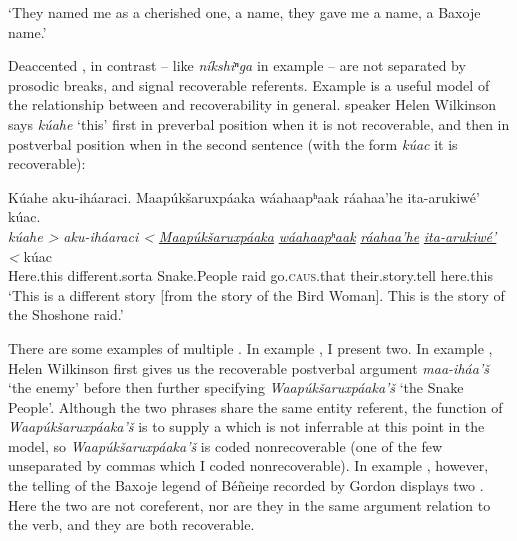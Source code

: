 \documentclass[output=paper]{LSP/langsci}
\begin{document}
\glt	`They named me as a cherished one, a name, they gave me a name, a Baxoje name.'
\z

Deaccented , in contrast -- like \emph{níkshiⁿga} in example  -- are not separated by prosodic breaks, and signal recoverable referents. Example  is a useful model of the relationship between  and recoverability in general.  speaker Helen Wilkinson says \emph{kúahe} `this' first in preverbal position when it is not recoverable, and then in postverbal position when in the second sentence (with the form \emph{kúac} it is recoverable):

\ea\label{wilkinsonpostverbal}
Kúahe aku-iháaraci. Maapúkšaruxpáaka wáahaapʰaak ráahaa’he ita-arukiwé’ kúac.\footnotemark\\
\gll	\emph{kúahe >}	\emph{aku-iháaraci <}	\emph{\underline{Maapúkšaruxpáaka}} 	\emph{\underline{wáahaapʰaak}} 	\emph{\underline{ráahaa’he}}			\emph{\underline{ita-arukiwé’} <}		kúac\\
	Here.this 		different.sorta		Snake.People 					raid 						go.\textsc{caus}.that 				their.story.tell 					here.this\\
\glt	`This is a different story [from the story of the Bird Woman]. This is the story of the Shoshone raid.'
\z

There are some examples of multiple . In example , I present two. In example , Helen Wilkinson first gives us the recoverable postverbal argument \emph{maa-iháa’š} `the enemy' before then further specifying \emph{Waapúkšaruxpáaka’š} `the Snake People'. Although the two phrases share the same entity referent, the function of \emph{Waapúkšaruxpáaka’š} is to supply a  which is not inferrable at this point in the  model, so \emph{Waapúkšaruxpáaka’š} is coded nonrecoverable (one of the few unseparated by commas which I coded nonrecoverable). In example , however, the telling of the Baxoje legend of Béñeiŋe recorded by Gordon \citet{Marsh1936} displays two . Here the two are not coreferent, nor are they in the same argument relation to the verb, and they are both recoverable. 
\end{document}
